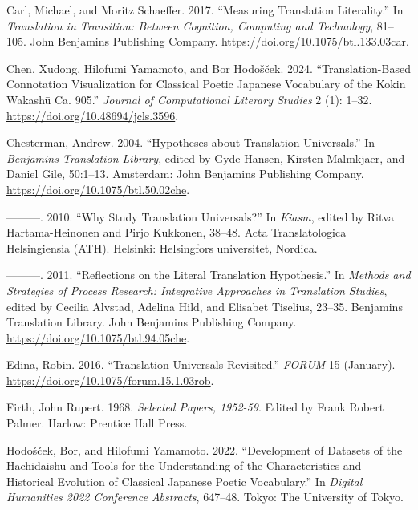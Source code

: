 \documentclass[
  letterpaper,
  DIV=11,
  numbers=noendperiod]{scrartcl}
\newlength{\cslhangindent}
\newenvironment{CSLReferences}[2] %
 {\begin{list}{}{%
  \setlength{\itemindent}{0pt}
  \setlength{\leftmargin}{0pt}
  \setlength{\parsep}{0pt}
  \ifodd #1
   \setlength{\leftmargin}{\cslhangindent}
   \setlength{\itemindent}{-1\cslhangindent}
  \fi
  \setlength{\itemsep}{#2\baselineskip}}}
 {\end{list}}
\begin{document}
\begin{CSLReferences}{1}{0}
Carl, Michael, and Moritz Schaeffer. 2017. {``Measuring {Translation
Literality}.''} In \emph{Translation in {Transition}: {Between
Cognition}, {Computing} and {Technology}}, 81--105. John Benjamins
Publishing Company. \url{https://doi.org/10.1075/btl.133.03car}.

Chen, Xudong, Hilofumi Yamamoto, and Bor Hodošček. 2024.
{``Translation-Based Connotation Visualization for Classical Poetic
{Japanese} Vocabulary of the {Kokin Wakash{ū}} Ca. 905.''} \emph{Journal
of Computational Literary Studies} 2 (1): 1--32.
\url{https://doi.org/10.48694/jcls.3596}.

Chesterman, Andrew. 2004. {``Hypotheses about Translation Universals.''}
In \emph{Benjamins {Translation Library}}, edited by Gyde Hansen,
Kirsten Malmkjaer, and Daniel Gile, 50:1--13. Amsterdam: John Benjamins
Publishing Company. \url{https://doi.org/10.1075/btl.50.02che}.

---------. 2010. {``Why Study Translation Universals?''} In
\emph{Kiasm}, edited by Ritva Hartama-Heinonen and Pirjo Kukkonen,
38--48. Acta {Translatologica Helsingiensia} ({ATH}). Helsinki:
Helsingfors universitet, Nordica.

---------. 2011. {``Reflections on the Literal Translation
Hypothesis.''} In \emph{Methods and {Strategies} of {Process Research}:
{Integrative} Approaches in {Translation Studies}}, edited by Cecilia
Alvstad, Adelina Hild, and Elisabet Tiselius, 23--35. Benjamins
{Translation Library}. John Benjamins Publishing Company.
\url{https://doi.org/10.1075/btl.94.05che}.

Edina, Robin. 2016. {``Translation {Universals Revisited}.''}
\emph{FORUM} 15 (January).
\url{https://doi.org/10.1075/forum.15.1.03rob}.

Firth, John Rupert. 1968. \emph{{Selected Papers, 1952-59}}. Edited by
Frank Robert Palmer. Harlow: Prentice Hall Press.

Hodošček, Bor, and Hilofumi Yamamoto. 2022. {``Development of Datasets
of the {Hachidaish{ū}} and Tools for the Understanding of the
Characteristics and Historical Evolution of Classical {Japanese} Poetic
Vocabulary.''} In \emph{Digital {Humanities} 2022 {Conference
Abstracts}}, 647--48. Tokyo: The University of Tokyo.


\end{CSLReferences}
\end{document}
